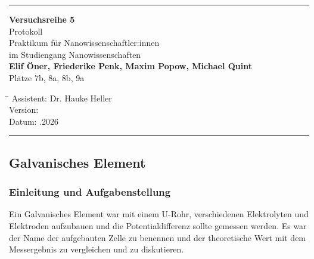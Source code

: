 \documentclass[
	a4paper,										%
	12pt,											%
	twoside,										%
	headsepline,								%
	footsepline,									%
	captions=tableheading,					%
]{scrartcl}
\begin{document}
	
	\begin{titlepage}
		\begin{center}
			\hrule													%
			\vspace*{5cm}
			\Huge {\textbf {Versuchsreihe 5}}\\						%
			\vspace*{0.5cm}
			\vspace*{1cm}
			\normalsize
			Protokoll	\\									
			Praktikum für Nanowissenschaftler:innen\\
			im Studiengang Nanowissenschaften\\
			\vspace*{0.5cm}
			\Large {\textbf{Elif Öner, Friederike Penk, Maxim Popow, Michael Quint}}		\\						%
			\vspace*{0.5cm}
					\normalsize{Plätze 7b, 8a, 8b, 9a}								%
			\vfill
		\end{center}
		\begin{tabbing}
			\hspace{3cm}\=\kill
			Assistent: \> Dr. Hauke Heller \\						%
			Version:  \\									%
			Datum: .2026 \\								%
		\end{tabbing}
		\hrule														%
\end{titlepage}

\setcounter{page}{1}
\setcounter{section}{5}								%
\setcounter{subsection}{0}							%
\setcounter{secnumdepth}{4}
	
\subsection{Galvanisches Element}

\subsubsection{Einleitung und Aufgabenstellung}
Ein Galvanisches Element war mit einem U-Rohr, verschiedenen Elektrolyten und Elektroden aufzubauen und die Potentialdifferenz sollte gemessen werden.
Es war der Name der aufgebauten Zelle zu benennen und der theoretische Wert mit dem Messergebnis zu vergleichen und zu diskutieren.
\end{document}
